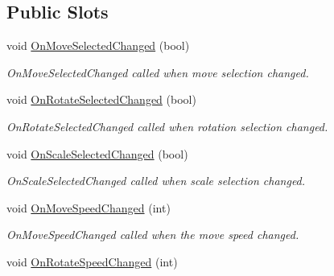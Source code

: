 \subsection*{Public Slots}
\begin{DoxyCompactItemize}
\item 
void \hyperlink{class_home_designer_open_g_l_widget_a17c63eebae07d7085b22aaf35746d59a}{On\+Move\+Selected\+Changed} (bool)
\begin{DoxyCompactList}\small\item\em On\+Move\+Selected\+Changed called when move selection changed. \end{DoxyCompactList}\item 
\hypertarget{class_home_designer_open_g_l_widget_ae46f16b4230341e60317f8cb9df8f53c}{}void \hyperlink{class_home_designer_open_g_l_widget_ae46f16b4230341e60317f8cb9df8f53c}{On\+Rotate\+Selected\+Changed} (bool)\label{class_home_designer_open_g_l_widget_ae46f16b4230341e60317f8cb9df8f53c}

\begin{DoxyCompactList}\small\item\em On\+Rotate\+Selected\+Changed called when rotation selection changed. \end{DoxyCompactList}\item 
\hypertarget{class_home_designer_open_g_l_widget_a3b689614d2a74932b75a7c18083b6c19}{}void \hyperlink{class_home_designer_open_g_l_widget_a3b689614d2a74932b75a7c18083b6c19}{On\+Scale\+Selected\+Changed} (bool)\label{class_home_designer_open_g_l_widget_a3b689614d2a74932b75a7c18083b6c19}

\begin{DoxyCompactList}\small\item\em On\+Scale\+Selected\+Changed called when scale selection changed. \end{DoxyCompactList}\item 
void \hyperlink{class_home_designer_open_g_l_widget_af6eec49ac86769b4fd23636743ac9150}{On\+Move\+Speed\+Changed} (int)
\begin{DoxyCompactList}\small\item\em On\+Move\+Speed\+Changed called when the move speed changed. \end{DoxyCompactList}\item 
\hypertarget{class_home_designer_open_g_l_widget_aeeb74ecdd39351f0229f28b394900581}{}void \hyperlink{class_home_designer_open_g_l_widget_aeeb74ecdd39351f0229f28b394900581}{On\+Rotate\+Speed\+Changed} (int)\label{class_home_designer_open_g_l_widget_aeeb74ecdd39351f0229f28b394900581}


\end{DoxyCompactItemize}
